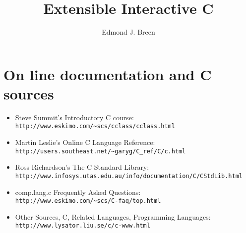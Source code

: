 \documentclass[12pt]{book}
\title{Extensible Interactive C }
\author{Edmond J. Breen}
\begin{document}
\maketitle

\frontmatter

\tableofcontents



\mainmatter







\appendix





 

\section*{On line documentation and C sources}
\begin{itemize}
\item  Steve Summit's Introductory C course: \\
\verb+http://www.eskimo.com/~scs/cclass/cclass.html+
\item  Martin Leslie's Online C Language Reference:\\
 \verb+http://users.southeast.net/~garyg/C_ref/C/c.html+
\item Ross Richardson's The C Standard Library:\\
\verb+http://www.infosys.utas.edu.au/info/documentation/C/CStdLib.html+
\item comp.lang.c Frequently Asked Questions:\\
\verb+http://www.eskimo.com/~scs/C-faq/top.html+
\item Other Sources, C,   Related Languages, Programming Languages:\\ 
\verb+http://www.lysator.liu.se/c/c-www.html+
\end{itemize}

\printindex
\end{document}
